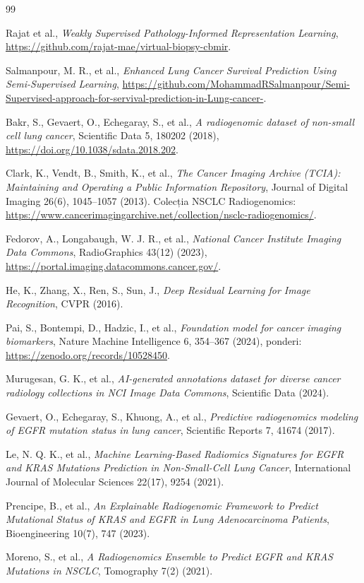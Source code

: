 \documentclass[runningheads,a4paper,11pt]{report}
\begin{document}
\renewcommand\bibname{Referințe}
\begin{thebibliography}{99}

Rajat et al., \textit{Weakly Supervised Pathology-Informed Representation Learning}, \url{https://github.com/rajat-mae/virtual-biopsy-cbmir}.

Salmanpour, M. R., et al., \textit{Enhanced Lung Cancer Survival Prediction Using Semi-Supervised Learning}, \url{https://github.com/MohammadRSalmanpour/Semi-Supervised-approach-for-servival-prediction-in-Lung-cancer-}.

Bakr, S., Gevaert, O., Echegaray, S., et al., \textit{A radiogenomic dataset of non-small cell lung cancer}, Scientific Data 5, 180202 (2018), \url{https://doi.org/10.1038/sdata.2018.202}.

Clark, K., Vendt, B., Smith, K., et al., \textit{The Cancer Imaging Archive (TCIA): Maintaining and Operating a Public Information Repository}, Journal of Digital Imaging 26(6), 1045--1057 (2013). Colecția NSCLC Radiogenomics: \url{https://www.cancerimagingarchive.net/collection/nsclc-radiogenomics/}.

Fedorov, A., Longabaugh, W. J. R., et al., \textit{National Cancer Institute Imaging Data Commons}, RadioGraphics 43(12) (2023), \url{https://portal.imaging.datacommons.cancer.gov/}.

He, K., Zhang, X., Ren, S., Sun, J., \textit{Deep Residual Learning for Image Recognition}, CVPR (2016).

Pai, S., Bontempi, D., Hadzic, I., et al., \textit{Foundation model for cancer imaging biomarkers}, Nature Machine Intelligence 6, 354--367 (2024), ponderi: \url{https://zenodo.org/records/10528450}.

Murugesan, G. K., et al., \textit{AI-generated annotations dataset for diverse cancer radiology collections in NCI Image Data Commons}, Scientific Data (2024).

Gevaert, O., Echegaray, S., Khuong, A., et al., \textit{Predictive radiogenomics modeling of EGFR mutation status in lung cancer}, Scientific Reports 7, 41674 (2017).

Le, N. Q. K., et al., \textit{Machine Learning-Based Radiomics Signatures for EGFR and KRAS Mutations Prediction in Non-Small-Cell Lung Cancer}, International Journal of Molecular Sciences 22(17), 9254 (2021).

Prencipe, B., et al., \textit{An Explainable Radiogenomic Framework to Predict Mutational Status of KRAS and EGFR in Lung Adenocarcinoma Patients}, Bioengineering 10(7), 747 (2023).

Moreno, S., et al., \textit{A Radiogenomics Ensemble to Predict EGFR and KRAS Mutations in NSCLC}, Tomography 7(2) (2021).

\end{thebibliography}
\end{document}
